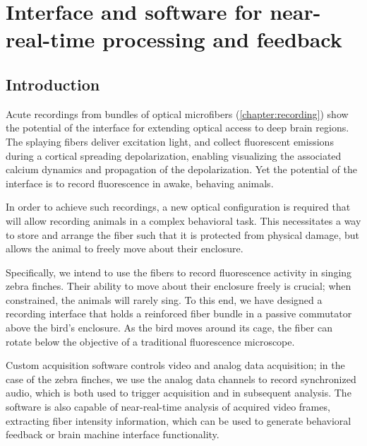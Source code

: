 \chapter{Interface and software for near-real-time processing and feedback}
\label{chapter:processing}

\thispagestyle{myheadings}

\graphicspath{{6_Processing/Figures/}}


\section{Introduction}

Acute recordings from bundles of optical microfibers 
(\cref{chapter:recording}) show the potential of the 
interface for extending optical access to deep brain 
regions. The splaying fibers deliver excitation light,
and collect fluorescent emissions during a cortical 
spreading depolarization, enabling visualizing the 
associated calcium dynamics and propagation of the 
depolarization. Yet the potential of the interface is 
to record fluorescence in awake, behaving animals.

In order to achieve such recordings, a new optical 
configuration is required that will allow recording 
animals in a complex behavioral task. This necessitates 
a way to store and arrange the fiber such that it is 
protected from physical damage, but allows the animal 
to freely move about their enclosure.

Specifically, we intend to use the fibers to record 
fluorescence activity in singing zebra finches. 
Their ability to move about their enclosure freely 
is crucial; when constrained, the animals will rarely 
sing. To this end, we have designed a recording interface 
that holds a reinforced fiber bundle in a passive 
commutator above the bird's enclosure. As the bird moves 
around its cage, the fiber can rotate below the objective 
of a traditional fluorescence microscope. 

Custom acquisition software controls video and analog 
data acquisition; in the case of the zebra finches, we 
use the analog data channels to record synchronized audio, 
which is both used to trigger acquisition and in subsequent 
analysis. The software is also capable of near-real-time 
analysis of acquired video frames, extracting fiber 
intensity information, which can be used to generate 
behavioral feedback or brain machine interface 
functionality.


